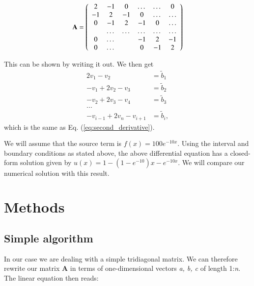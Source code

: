 \documentclass{article}
\begin{document}
\begin{multicols}{2}
\begin{equation}
    {\bf A} = \left(\begin{array}{cccccc}
                           2& -1& 0 &\dots   & \dots &0 \\
                           -1 & 2 & -1 &0 &\dots &\dots \\
                           0&-1 &2 & -1 & 0 & \dots \\
                           & \dots   & \dots &\dots   &\dots & \dots \\
                           0&\dots   &  &-1 &2& -1 \\
                           0&\dots    &  & 0  &-1 & 2 \\
                      \end{array} \right)
\end{equation}

\noindent This can be shown by writing it out. We then get
\begin{align*}
	2v_1 - v_2 &= \tilde{b}_1 \\
	-v_1 + 2v_2 - v_3 &= \tilde{b}_2 \\
	-v_2 + 2v_3 - v_4 &= \tilde{b}_3 \\
	... \\
	-v_{i-1} + 2v_n - v_{i+1} &= \tilde{b}_i,
\end{align*}
which is the same as Eq. (\ref{eq:second_derivative}). 

We will assume that the source term is $f(x) = 100e^{-10x}$. Using the interval and boundary conditions as stated above, the above differential equation has a closed-form  solution given by $u(x) = 1-(1-e^{-10})x-e^{-10x}$. We will compare our numerical solution with this result. 





\section{Methods}
\subsection{Simple algorithm}
In our case we are dealing with a simple tridiagonal matrix. We can therefore rewrite our matrix \textbf{A} in terms of one-dimensional vectors \textit{a, b, c} of length 1:\textit{n}. The linear equation then reads:


\end{multicols}
\end{document}
